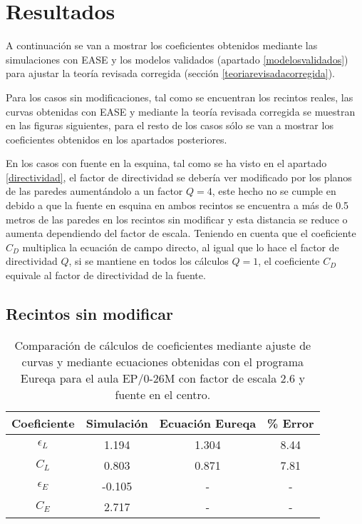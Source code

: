 
\chapter{Resultados}
\label{resultados}

A continuación se van a mostrar los coeficientes obtenidos mediante las simulaciones con EASE y los modelos validados (apartado \ref{modelosvalidados})  para ajustar la teoría revisada corregida (sección \ref{teoriarevisadacorregida}).

Para los casos sin modificaciones, tal como se encuentran los recintos reales, las curvas obtenidas con EASE y mediante la teoría revisada corregida se muestran en las figuras siguientes, para el resto de los casos sólo se van a mostrar los coeficientes obtenidos en los apartados posteriores.

En los casos con fuente en la esquina, tal como se ha visto en el apartado \ref{directividad}, el factor de directividad se debería ver modificado por los planos de las paredes aumentándolo a un factor $Q=4$, este hecho no se cumple en debido a que la fuente en esquina en ambos recintos se encuentra a más de 0.5 metros de las paredes en los recintos sin modificar y esta distancia se reduce o aumenta dependiendo del factor de escala.
Teniendo en cuenta que el coeficiente $C_D$ multiplica la ecuación de campo directo, al igual que lo hace el factor de directividad $Q$, si se mantiene en todos los cálculos $Q=1$, el coeficiente $C_D$ equivale al factor de directividad de la fuente.

\section{Recintos sin modificar}


\begin{table}[ht]
\centering
{
\begin{tabular}{@{}cccc@{}}
\toprule
Coeficiente & Simulación & Ecuación Eureqa & \% Error \\ \midrule
$\epsilon_L$ & 1.194 & 1.304 & 8.44 \\
$C_L$ & 0.803 & 0.871 & 7.81 \\
$\epsilon_E$ & -0.105 & - & - \\
$C_E$ & 2.717 & - & - \\ \bottomrule
\end{tabular}
}
\caption{Comparación de cálculos de coeficientes mediante ajuste de curvas y mediante ecuaciones obtenidas con el programa Eureqa para el aula EP/0-26M con factor de escala 2.6 y fuente en el centro.}
\label{tab:comparaecuscentro}
\vspace{-0.5cm}
\end{table}
\FloatBarrier






